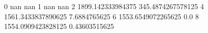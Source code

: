 0 nan nan
1 nan nan
2 1899.142333984375 345.4874267578125
4 1561.3433837890625 7.6884765625
6 1553.6549072265625 0.0
8 1554.0909423828125 0.43603515625
